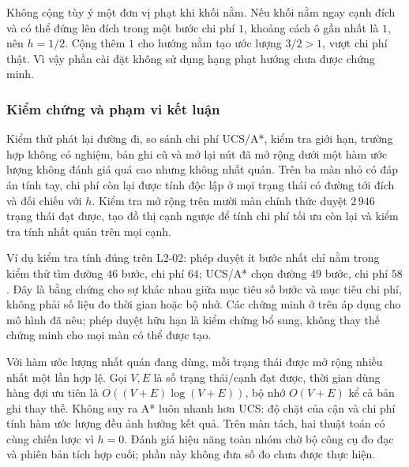Không cộng tùy ý một đơn vị phạt khi khối nằm. Nếu khối nằm ngay cạnh đích và
có thể đứng lên đích trong một bước chi phí $1$, khoảng cách ô gần nhất là $1$,
nên $h=1/2$. Cộng thêm $1$ cho hướng nằm tạo ước lượng $3/2>1$, vượt chi phí
thật. Vì vậy phần cài đặt không sử dụng hạng phạt hướng chưa được chứng minh.

\subsubsection{Kiểm chứng và phạm vi kết luận}
Kiểm thử phát lại đường đi, so sánh chi phí UCS/A*, kiểm tra giới hạn, trường
hợp không có nghiệm, bản ghi cũ và mở lại nút đã mở rộng dưới một hàm ước lượng
không đánh giá quá cao nhưng không nhất quán. Trên ba màn nhỏ có đáp án tính
tay, chi phí còn lại được tính độc lập ở mọi trạng thái có đường tới đích và
đối chiếu với $h$. Kiểm tra mở rộng trên mười màn chính thức duyệt $2\,946$
trạng thái đạt được, tạo đồ thị cạnh ngược để tính chi phí tối ưu còn lại và
kiểm tra tính nhất quán trên mọi cạnh.

Ví dụ kiểm tra tính đúng trên L2-02: phép duyệt ít bước nhất chỉ nằm trong
kiểm thử tìm đường $46$ bước, chi phí $64$; UCS/A* chọn đường $49$ bước, chi
phí $58$. Đây là bằng chứng cho sự khác nhau giữa mục tiêu số bước và mục tiêu
chi phí, không phải số liệu đo thời gian hoặc bộ nhớ. Các chứng minh ở trên
áp dụng cho mô hình đã nêu; phép duyệt hữu hạn là kiểm chứng bổ sung, không
thay thế chứng minh cho mọi màn có thể được tạo.

Với hàm ước lượng nhất quán đang dùng, mỗi trạng thái được mở rộng nhiều nhất
một lần hợp lệ. Gọi $V,E$ là số trạng thái/cạnh đạt được, thời gian dùng hàng
đợi ưu tiên là $O((V+E)\log(V+E))$, bộ nhớ $O(V+E)$ kể cả bản ghi thay thế.
Không suy ra A* luôn nhanh hơn UCS: độ chặt của cận và chi phí tính hàm ước
lượng đều ảnh hưởng kết quả. Trên màn tách, hai thuật toán có cùng chiến lược
vì $h=0$. Đánh giá hiệu năng toàn nhóm chờ bộ công cụ đo đạc và phiên bản tích
hợp cuối; phần này không đưa số đo chưa được thực hiện.
